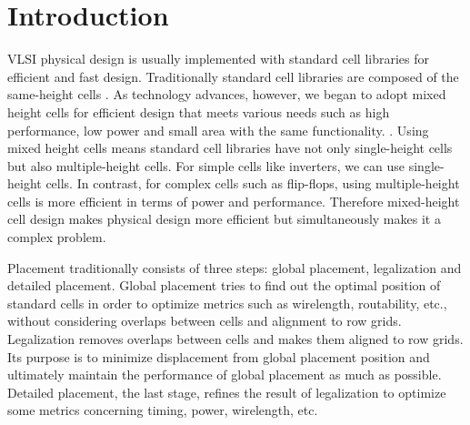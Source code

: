 \documentclass[sigconf,authordraft]{acmart}
\begin{document}
\maketitle
\section{Introduction}

VLSI physical design is usually implemented with standard cell libraries for efficient and fast design. Traditionally standard cell libraries are composed of the same-height cells \cite{wang2004standard}. As technology advances, however, we began to adopt mixed height cells for efficient design that meets various needs such as high performance, low power and small area with the same functionality. \cite{baek2008ultra, dobre2015mixed}. Using mixed height cells means standard cell libraries have not only single-height cells but also multiple-height cells. For simple cells like inverters, we can use single-height cells. In contrast, for complex cells such as flip-flops, using multiple-height cells is more efficient in terms of power and performance. Therefore mixed-height cell design makes physical design more efficient but simultaneously makes it a complex problem. \par

Placement traditionally consists of three steps: global placement, legalization and detailed placement. Global placement tries to find out the optimal position of standard cells in order to optimize metrics such as wirelength, routability, etc., without considering overlaps between cells and alignment to row grids. Legalization removes overlaps between cells and makes them aligned to row grids. Its purpose is to minimize displacement from global placement position and ultimately maintain the performance of global placement as much as possible. Detailed placement, the last stage, refines the result of legalization to optimize some metrics concerning timing, power, wirelength, etc.  \par
\end{document}
